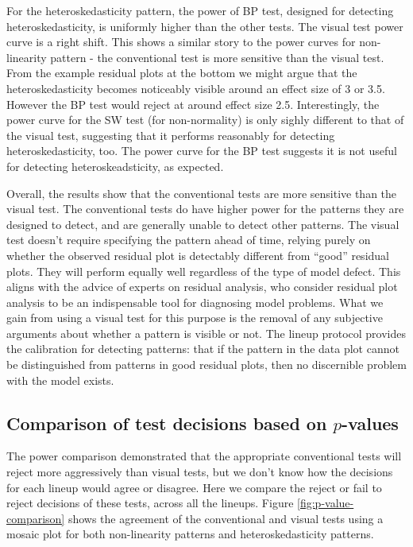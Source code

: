 \documentclass[]{interact}
\theoremstyle{plain}%
\theoremstyle{definition}
\theoremstyle{remark}
\begin{document}
For the heteroskedasticity pattern, the power of BP test, designed for
detecting heteroskedasticity, is uniformly higher than the other tests.
The visual test power curve is a right shift. This shows a similar story
to the power curves for non-linearity pattern - the conventional test is
more sensitive than the visual test. From the example residual plots at
the bottom we might argue that the heteroskedasticity becomes noticeably
visible around an effect size of 3 or 3.5. However the BP test would
reject at around effect size 2.5. Interestingly, the power curve for the
SW test (for non-normality) is only sighly different to that of the
visual test, suggesting that it performs reasonably for detecting
heteroskedasticity, too. The power curve for the BP test suggests it is
not useful for detecting heteroskeadsticity, as expected.

Overall, the results show that the conventional tests are more sensitive
than the visual test. The conventional tests do have higher power for
the patterns they are designed to detect, and are generally unable to
detect other patterns. The visual test doesn't require specifying the
pattern ahead of time, relying purely on whether the observed residual
plot is detectably different from ``good'' residual plots. They will
perform equally well regardless of the type of model defect. This aligns
with the advice of experts on residual analysis, who consider residual
plot analysis to be an indispensable tool for diagnosing model problems.
What we gain from using a visual test for this purpose is the removal of
any subjective arguments about whether a pattern is visible or not. The
lineup protocol provides the calibration for detecting patterns: that if
the pattern in the data plot cannot be distinguished from patterns in
good residual plots, then no discernible problem with the model exists.

\hypertarget{comparison-of-test-decisions-based-on-p-values}{%
\subsection{\texorpdfstring{Comparison of test decisions based on
\(p\)-values\label{p-value}}{Comparison of test decisions based on p-values}}\label{comparison-of-test-decisions-based-on-p-values}}

The power comparison demonstrated that the appropriate conventional
tests will reject more aggressively than visual tests, but we don't know
how the decisions for each lineup would agree or disagree. Here we
compare the reject or fail to reject decisions of these tests, across
all the lineups. Figure \ref{fig:p-value-comparison} shows the agreement
of the conventional and visual tests using a mosaic plot for both
non-linearity patterns and heteroskedasticity patterns.
\end{document}
